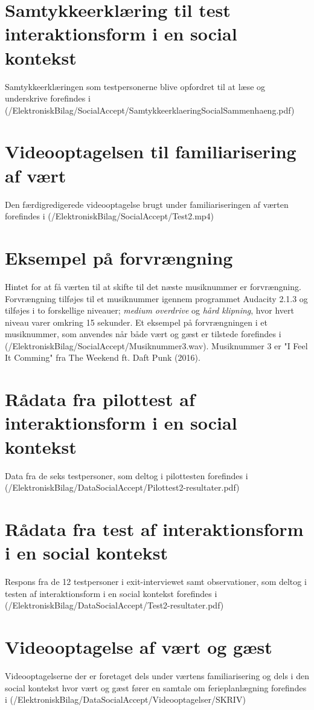 \section{Samtykkeerklæring til test interaktionsform i en social kontekst}
\label{app:SamtykkeerklaeringSocialAccept}
%
Samtykkeerklæringen som testpersonerne blive opfordret til at læse og underskrive forefindes i (/ElektroniskBilag/SocialAccept/SamtykkeerklaeringSocialSammenhaeng.pdf)
%
\section{Videooptagelsen til familiarisering af vært}
\label{app:VideooptagelseFam}
%
Den færdigredigerede videooptagelse brugt under familiariseringen af værten forefindes i (/ElektroniskBilag/SocialAccept/Test2.mp4)
%
\section{Eksempel på forvrængning}
\label{app:ForvraengningHint}
%
Hintet for at få værten til at skifte til det næste musiknummer er forvrængning. Forvrængning tilføjes til et musiknummer igennem programmet Audacity 2.1.3 og tilføjes i to forskellige niveauer; \textit{medium overdrive} og \textit{hård klipning}, hvor hvert niveau varer omkring 15 sekunder. Et eksempel på forvrængningen i et musiknummer, som anvendes når både vært og gæst er tilstede forefindes i (/ElektroniskBilag/SocialAccept/Musiknummer3.wav). Musiknummer 3 er "I Feel It Comming" fra The Weekend ft. Daft Punk (2016).
%
\section{Rådata fra pilottest af interaktionsform i en social kontekst}
\label{app:ResultaterPilottestSocialAccept}
%
Data fra de seks testpersoner, som deltog i pilottesten forefindes i \\
(/ElektroniskBilag/DataSocialAccept/Pilottest2-resultater.pdf)
%
\section{Rådata fra test af interaktionsform i en social kontekst}
\label{app:ResultaterSocialAccept}
%
Respons fra de 12 testpersoner i exit-interviewet samt observationer, som deltog i testen af interaktionsform i en social kontekst forefindes i (/ElektroniskBilag/DataSocialAccept/Test2-resultater.pdf)
%
\section{Videooptagelse af vært og gæst}
\label{app:VideooptagelseVaertOgGaest}
%
Videooptagelserne der er foretaget dels under værtens familiarisering og dels i den social kontekst hvor vært og gæst fører en samtale om ferieplanlægning forefindes i (/ElektroniskBilag/DataSocialAccept/Videooptagelser/SKRIV)


